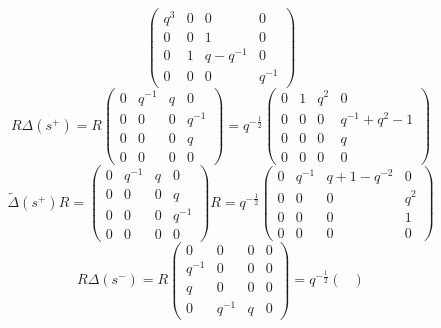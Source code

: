 \documentclass[12pt]{article}
\theoremstyle{definition}
\begin{document}
\begin{enumerate}
\begin{equation}
\begin{pmatrix}
            q^3 & 0 & 0 & 0\\
            0 & 0 & 1 & 0\\
            0 & 1 & q-q^{-1} & 0\\
            0 & 0 & 0 & q^{-1}
        \end{pmatrix}
    \end{equation}
    \begin{equation}
        R\Delta(s^+)=R\begin{pmatrix}
            0 & q^{-1} & q & 0\\
            0 & 0 & 0 & q^{-1}\\
            0 & 0 & 0 & q\\
            0 & 0 & 0 & 0
        \end{pmatrix}=q^{-\frac{1}{2}}\begin{pmatrix}
            0 & 1 & q^2 & 0\\
            0 & 0 & 0 & q^{-1}+q^2-1\\
            0 & 0 & 0 & q\\
            0 & 0 & 0 & 0
        \end{pmatrix}
    \end{equation}
    \begin{equation}
        \tilde\Delta(s^+)R=\begin{pmatrix}
            0 & q^{-1} & q & 0\\
            0 & 0 & 0 & q\\
            0 & 0 & 0 & q^{-1}\\
            0 & 0 & 0 & 0
        \end{pmatrix}R=q^{-\frac{1}{2}}\begin{pmatrix}
            0 & q^{-1} & q+1-q^{-2} & 0\\
            0 & 0 & 0 & q^2\\
            0 & 0 & 0 & 1\\
            0 & 0 & 0 & 0
        \end{pmatrix}
    \end{equation}
    \begin{equation}
        R\Delta(s^-)=R\begin{pmatrix}
            0 & 0 & 0 & 0\\
            q^{-1} & 0 & 0 & 0\\
            q & 0 & 0 & 0\\
            0 & q^{-1} & q & 0
        \end{pmatrix}=q^{-\frac{1}{2}}\begin{pmatrix}

\end{pmatrix}
\end{equation}
\end{enumerate}
\end{document}
